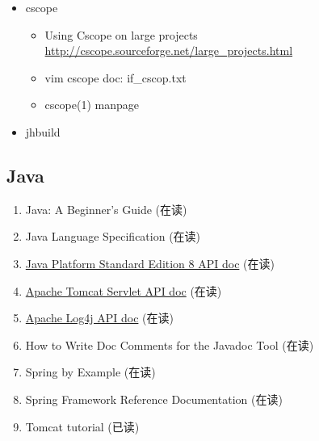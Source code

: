 \documentclass{article}
\begin{document}
\begin{enumerate}
\begin{itemize}
            \item cscope
                \begin{itemize}
                    \item Using Cscope on large projects \url{http://cscope.sourceforge.net/large_projects.html}
                    \item vim cscope doc: if_cscop.txt
                    \item cscope(1) manpage
                \end{itemize}
            \item jhbuild
        \end{itemize}
\end{enumerate}
\subsection{Java}
\begin{enumerate}
    \item Java: A Beginner's Guide (在读)
    \item Java Language Specification (在读)
    \item \href{http://docs.oracle.com/javase/8/docs/api/index.html?overview-summary.html}{Java Platform Standard Edition 8 API doc} (在读)
    \item \href{http://tomcat.apache.org/tomcat-8.0-doc/servletapi/}{Apache Tomcat Servlet API doc} (在读)
    \item \href{http://logging.apache.org/log4j/2.x/log4j-api/apidocs/index.html}{Apache Log4j API doc} (在读)
    \item How to Write Doc Comments for the Javadoc Tool (在读)
    \item Spring by Example (在读)
    \item Spring Framework Reference Documentation (在读)
    \item Tomcat tutorial (已读)
\end{enumerate}
\end{document}
